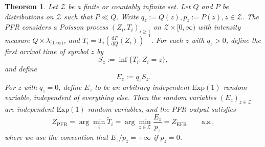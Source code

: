 \documentclass{article}
\theoremstyle{plain}
\newtheorem{theorem}{Theorem}[section]
\theoremstyle{definition}
\begin{document}
\begin{theorem}
\label{thm::PFR_reduces_to_EFR}
Let $\mathcal{Z}$ be a finite or countably infinite set. Let $Q$ and $P$ be distributions on $\mathcal{Z}$ such that $P\ll Q$. Write $q_z:=Q(z), p_z:=P(z), z\in\mathcal{Z}$. 
The PFR considers a Poisson process $(Z_i,T_i)_{i\geq 1}$ on $\mathcal{Z}\times[0,\infty)$ with intensity measure
$Q\times\lambda_{[0,\infty)}$, and $\tilde T_i = T_i\left(\frac{\mathrm{d}P}{\mathrm{d}Q}(Z_i)\right)^{-1}$. 
For each $z$ with $q_z>0$, define the first arrival time of symbol $z$ by
\begin{equation}
    S_z:=\inf\{T_i:Z_i=z\},
    \label{eq:first_arrival_symbol_z}
\end{equation}
and define
\begin{equation}
    E_z:=q_z S_z .
    \label{eq:Ez_from_PFR}
\end{equation}
For $z$ with $q_z=0$, define $E_z$ to be an arbitrary independent $\mathrm{Exp}(1)$ random variable, independent of everything else. Then the random variables $(E_z)_{z\in\mathcal{Z}}$ are independent $\mathrm{Exp}(1)$ random variables, and the PFR output satisfies
\begin{equation}
    Z_{\mathrm{PFR}}
    =
    \arg\min_i \tilde T_i
    =
    \arg\min_{z\in\mathcal{Z}}\frac{E_z}{p_z}
    =
    Z_{\mathrm{EFR}}
    \qquad \text{a.s.},
    \label{eq:PFR_equals_EFR}
\end{equation}
where we use the convention that $E_z/p_z=+\infty$ if $p_z=0$.
\end{theorem}
\end{document}
